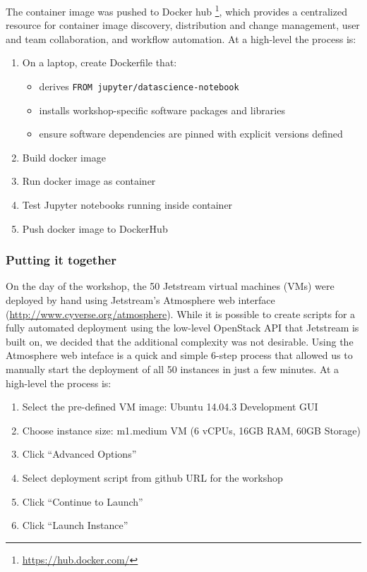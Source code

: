 The container image was pushed to Docker hub \footnote{\url{https://hub.docker.com/}},
which provides a centralized resource for container image discovery,
distribution and change management, user and team collaboration, and workflow
automation. At a high-level the process is:

\begin{enumerate}
  \item On a laptop, create Dockerfile that:
  \begin{itemize}
    \item derives \texttt{FROM jupyter/datascience-notebook}
    \item installs workshop-specific software packages and libraries
    \item ensure software dependencies are pinned with explicit versions defined
  \end{itemize}
  \item Build docker image
  \item Run docker image as container
  \item Test Jupyter notebooks running inside container
  \item Push docker image to DockerHub
\end{enumerate}

\subsubsection{Putting it together}


On the day of the workshop, the 50 Jetstream virtual machines (VMs) were
deployed by hand using Jetstream's Atmosphere web interface
(\url{http://www.cyverse.org/atmosphere}). While it is possible to create
scripts for a fully automated deployment using the low-level OpenStack API that
Jetstream is built on, we decided that the additional complexity was not
desirable. Using the Atmosphere web inteface is a quick and simple 6-step
process that allowed us to manually start the deployment of all 50 instances in
just a few minutes. At a high-level the process is:

\begin{enumerate}
\item Select the pre-defined VM image: Ubuntu 14.04.3 Development GUI
\item Choose instance size: m1.medium VM (6 vCPUs, 16GB RAM, 60GB
  Storage)
\item Click ``Advanced Options''
\item Select deployment script from github URL for the workshop
\item Click ``Continue to Launch''
\item Click ``Launch Instance''
\end{enumerate}

